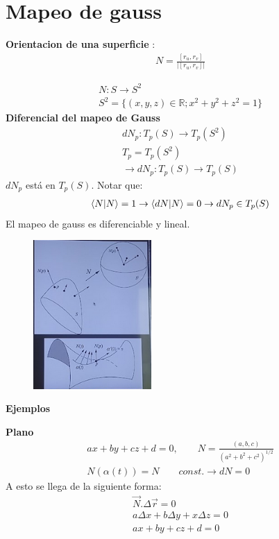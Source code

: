 \documentclass{article}
\newcommand{\caja}[3]{%
  \begin{tcolorbox}[colback=#1!5!white,colframe=#1!25!black,title=#2]
    #3
  \end{tcolorbox}%
}
\begin{document}
\section{Mapeo de gauss }
\textbf{Orientacion de una superficie }: 
\begin{gather}
  N = \frac{[r _{u } , r _{v } ]}{\left|[r _{u } , r _{v } ]\right|} 
\end{gather}
\caja{green}{Mapeo de gauss }{
  \begin{gather}
    N : S \rightarrow S ^ {2 }\\
    S ^ {2 } = \{ (x,y,z) \in \mathbb{R}; x ^ {2 } + y ^ {2 }+ z ^2 = 1   \}
  \end{gather}
  \textbf{Diferencial del mapeo de Gauss }
  \begin{gather}
    dN _{p } : T _{p } (S) \rightarrow T _{p } (S ^ {2 })\\
    T _{p } = T _{p } (S ^ {2 })\\
    \rightarrow dN _{p } : T _{p } (S) \rightarrow T _{p } (S)
  \end{gather}
  $ d N _{p }  $ está en $ T _{p } (S)  $. Notar que: 
  \begin{gather}
    \bra{N}\ket{N} = 1 \rightarrow \bra{dN }\ket{N } = 0 \rightarrow dN _{p } \in T _{p } (S)   
  \end{gather}
  \tcblower 
  El mapeo de gauss es diferenciable y lineal.
}
\begin{figure}[H]
  \begin{center}
    \includegraphics[width=0.4\textwidth]{mapeo_gauss.png }
  \end{center}
\end{figure}

\textbf{Ejemplos }

\textbf{Plano }
\begin{gather}
  ax + by + cz + d = 0, \qquad N = \frac{(a,b,c) }{(a ^2 + b ^2+ c ^2 )^ {1/2 }}\\
  N (\alpha(t)) = N \qquad const. \rightarrow dN = 0
\end{gather}
A esto se llega de la siguiente forma: 
\begin{gather}
  \vec N . \Delta \vec r = 0 \\   
  a \Delta x + b \Delta y + x \Delta z  = 0 \\
  ax+by+cz+d = 0
\end{gather}
\end{document}
